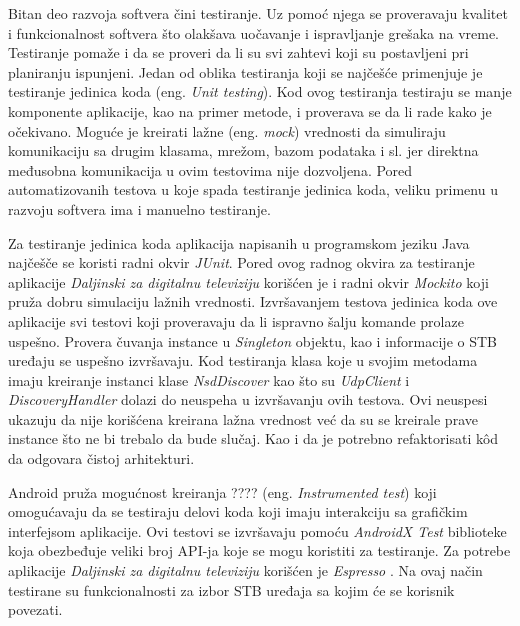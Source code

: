 \documentclass[../TamaraIvanovicMasterRad.tex]{subfiles}
\begin{document}
Bitan deo razvoja softvera čini testiranje. Uz pomoć njega se proveravaju kvalitet i funkcionalnost softvera što olakšava uočavanje i ispravljanje grešaka na vreme. Testiranje pomaže i da se proveri da li su svi zahtevi koji su postavljeni pri planiranju ispunjeni. Jedan od oblika testiranja koji se najčešće primenjuje je testiranje jedinica koda (eng. \textit{Unit testing}). Kod ovog testiranja testiraju se manje komponente aplikacije, kao na primer metode, i proverava se da li rade kako je očekivano. Moguće je kreirati lažne (eng. \textit{mock}) vrednosti da simuliraju komunikaciju sa drugim klasama, mrežom, bazom podataka i sl. jer direktna međusobna komunikacija u ovim testovima nije dozvoljena. Pored automatizovanih testova u koje spada testiranje jedinica koda, veliku primenu u razvoju softvera ima i manuelno testiranje. 

Za testiranje jedinica koda aplikacija napisanih u programskom jeziku Java najčešče se koristi radni okvir \textit{JUnit}\cite{sajt:junit}. Pored ovog radnog okvira za testiranje aplikacije \textit{Daljinski za digitalnu televiziju} korišćen je i radni okvir \textit{Mockito} \cite{sajt:mockito} koji pruža dobru simulaciju lažnih vrednosti. Izvršavanjem testova jedinica koda ove aplikacije svi testovi koji proveravaju da li ispravno šalju komande prolaze uspešno. Provera čuvanja instance u \textit{Singleton} objektu, kao i informacije o STB uređaju se uspešno izvršavaju. Kod testiranja klasa koje u svojim metodama imaju kreiranje instanci klase \textit{NsdDiscover} kao što su \textit{UdpClient} i \textit{DiscoveryHandler} dolazi do neuspeha u izvršavanju ovih testova. Ovi neuspesi ukazuju da nije korišćena kreirana lažna vrednost već da su se kreirale prave instance što ne bi trebalo da bude slučaj. Kao i da je potrebno refaktorisati k\^{o}d da odgovara čistoj arhitekturi.

Android pruža mogućnost kreiranja ???? (eng. \textit{Instrumented test}) \cite{sajt:instrumentedT} koji omogućavaju da se testiraju delovi koda koji imaju interakciju sa grafičkim interfejsom aplikacije. Ovi testovi se izvršavaju pomoću \textit{AndroidX Test} biblioteke koja obezbeđuje veliki broj API-ja koje se mogu koristiti za testiranje. Za potrebe aplikacije \textit{Daljinski za digitalnu televiziju} korišćen je \textit{Espresso} \cite{sajt:espresspT}. Na ovaj način testirane su funkcionalnosti za izbor STB uređaja sa kojim će se korisnik povezati. 
\end{document}
